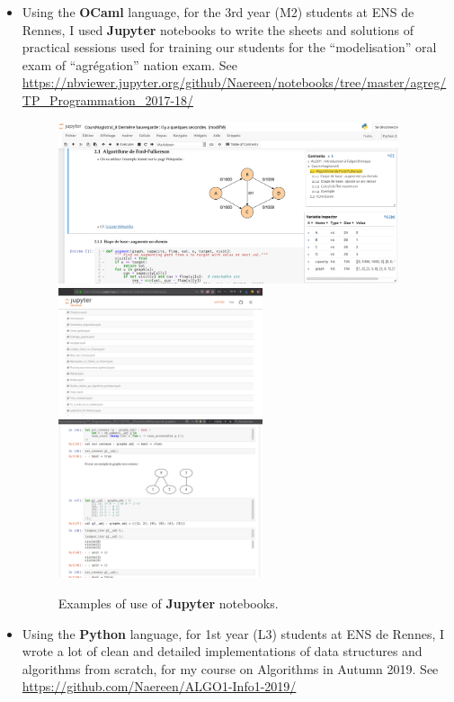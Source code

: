 \documentclass[runningheads]{llncs}
\newcommand{\Jupyter}{\textbf{Jupyter}}
\begin{document}
\begin{itemize}
    \item
    Using the \textbf{OCaml} language,
    for the 3rd year (M2) students at ENS de Rennes,
    I used \Jupyter{} notebooks to write the sheets and solutions of practical sessions used for training our students for the ``modelisation'' oral exam of ``agr{\'e}gation'' nation exam.
    See \url{https://nbviewer.jupyter.org/github/Naereen/notebooks/tree/master/agreg/TP_Programmation_2017-18/}

    \begin{figure}[!h]
        \centering
        \includegraphics[width=10cm]{apercu_ENS_agreg_4.png}
        \includegraphics[width=6cm]{apercu_ENS_agreg_1.png}
        \includegraphics[width=6cm]{apercu_ENS_agreg_3.png}
        \caption{Examples of use of \Jupyter{} notebooks.}
        \label{}
    \end{figure}


    \item
    Using the \textbf{Python} language, for 1st year (L3) students at ENS de Rennes,
    I wrote a lot of clean and detailed implementations of data structures and algorithms from scratch, for my course on Algorithms in Autumn 2019.
    See \url{https://github.com/Naereen/ALGO1-Info1-2019/}


\end{itemize}
\end{document}
